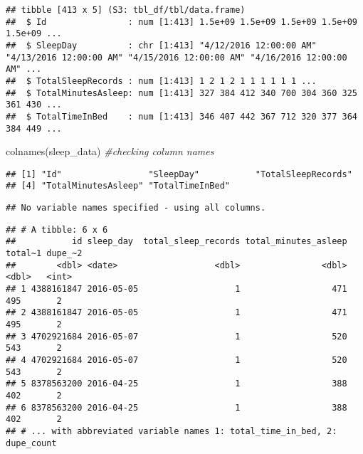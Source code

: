 \documentclass[
]{article}
\newenvironment{Shaded}{\begin{snugshade}}{\end{snugshade}}
\newcommand{\CommentTok}[1]{\textcolor[rgb]{0.56,0.35,0.01}{\textit{#1}}}
\newcommand{\FunctionTok}[1]{\textcolor[rgb]{0.00,0.00,0.00}{#1}}
\newcommand{\NormalTok}[1]{#1}
\newcommand{\OtherTok}[1]{\textcolor[rgb]{0.56,0.35,0.01}{#1}}
\newcommand{\SpecialCharTok}[1]{\textcolor[rgb]{0.00,0.00,0.00}{#1}}
\newcommand{\StringTok}[1]{\textcolor[rgb]{0.31,0.60,0.02}{#1}}
\begin{document}
\begin{verbatim}
## tibble [413 x 5] (S3: tbl_df/tbl/data.frame)
##  $ Id                : num [1:413] 1.5e+09 1.5e+09 1.5e+09 1.5e+09 1.5e+09 ...
##  $ SleepDay          : chr [1:413] "4/12/2016 12:00:00 AM" "4/13/2016 12:00:00 AM" "4/15/2016 12:00:00 AM" "4/16/2016 12:00:00 AM" ...
##  $ TotalSleepRecords : num [1:413] 1 2 1 2 1 1 1 1 1 1 ...
##  $ TotalMinutesAsleep: num [1:413] 327 384 412 340 700 304 360 325 361 430 ...
##  $ TotalTimeInBed    : num [1:413] 346 407 442 367 712 320 377 364 384 449 ...
\end{verbatim}

\begin{Shaded}
\begin{Highlighting}[]
 \FunctionTok{colnames}\NormalTok{(sleep\_data)  }\CommentTok{\#checking column names}
\end{Highlighting}
\end{Shaded}

\begin{verbatim}
## [1] "Id"                 "SleepDay"           "TotalSleepRecords" 
## [4] "TotalMinutesAsleep" "TotalTimeInBed"
\end{verbatim}

\begin{Shaded}
\end{Shaded}

\begin{verbatim}
## No variable names specified - using all columns.
\end{verbatim}

\begin{verbatim}
## # A tibble: 6 x 6
##           id sleep_day  total_sleep_records total_minutes_asleep total~1 dupe_~2
##        <dbl> <date>                   <dbl>                <dbl>   <dbl>   <int>
## 1 4388161847 2016-05-05                   1                  471     495       2
## 2 4388161847 2016-05-05                   1                  471     495       2
## 3 4702921684 2016-05-07                   1                  520     543       2
## 4 4702921684 2016-05-07                   1                  520     543       2
## 5 8378563200 2016-04-25                   1                  388     402       2
## 6 8378563200 2016-04-25                   1                  388     402       2
## # ... with abbreviated variable names 1: total_time_in_bed, 2: dupe_count
\end{verbatim}
\end{document}
